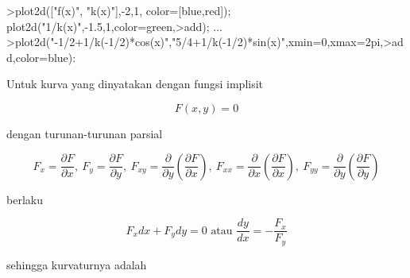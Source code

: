 \documentclass{article}
\begin{document}
\begin{eulernotebook}
\begin{eulercomment}
\begin{eulercomment}
\begin{eulercomment}
\begin{eulercomment}
\begin{eulercomment}
\begin{eulercomment}
\begin{eulercomment}
\begin{eulercomment}
\begin{eulercomment}
\begin{eulercomment}
\begin{eulercomment}
\begin{eulercomment}
\begin{eulercomment}
\begin{eulercomment}
\begin{eulercomment}
\begin{eulercomment}
\begin{eulercomment}
\begin{eulercomment}
\begin{eulercomment}
\begin{eulercomment}
\begin{eulercomment}
\begin{eulercomment}
\begin{eulercomment}
\end{eulercomment}
\begin{eulerprompt}
>plot2d(["f(x)", "k(x)"],-2,1, color=[blue,red]); plot2d("1/k(x)",-1.5,1,color=green,>add); ...
>plot2d("-1/2+1/k(-1/2)*cos(x)","5/4+1/k(-1/2)*sin(x)",xmin=0,xmax=2pi,>add,color=blue):
\end{eulerprompt}
\begin{eulercomment}
Untuk kurva yang dinyatakan dengan fungsi implisit

\end{eulercomment}
\begin{eulerformula}
\[
F(x,y)=0
\]
\end{eulerformula}
\begin{eulercomment}
dengan turunan-turunan parsial

\end{eulercomment}
\begin{eulerformula}
\[
F_x=\frac{\partial F}{\partial x},\ F_y=\frac{\partial F}{\partial y},\ F_{xy}=\frac{\partial}{\partial y}\left(\frac{\partial F}{\partial x}\right),\ F_{xx}=\frac{\partial}{\partial x}\left(\frac{\partial F}{\partial x}\right),\ F_{yy}=\frac{\partial}{\partial y}\left(\frac{\partial F}{\partial y}\right)
\]
\end{eulerformula}
\begin{eulercomment}
berlaku

\end{eulercomment}
\begin{eulerformula}
\[
F_x dx+ F_y dy = 0\text{ atau } \frac{dy}{dx}=-\frac{F_x}{F_y}
\]
\end{eulerformula}
\begin{eulercomment}
sehingga kurvaturnya adalah


\end{eulercomment}
\end{eulercomment}
\end{eulercomment}
\end{eulercomment}
\end{eulercomment}
\end{eulercomment}
\end{eulercomment}
\end{eulercomment}
\end{eulercomment}
\end{eulercomment}
\end{eulercomment}
\end{eulercomment}
\end{eulercomment}
\end{eulercomment}
\end{eulercomment}
\end{eulercomment}
\end{eulercomment}
\end{eulercomment}
\end{eulercomment}
\end{eulercomment}
\end{eulercomment}
\end{eulercomment}
\end{eulercomment}
\end{eulernotebook}
\end{document}
